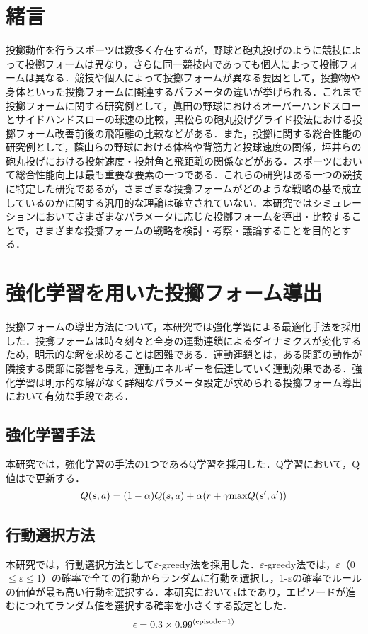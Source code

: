 \section{緒言}
投擲動作を行うスポーツは数多く存在するが，野球と砲丸投げのように競技によって投擲フォームは異なり，さらに同一競技内であっても個人によって投擲フォームは異なる．競技や個人によって投擲フォームが異なる要因として，投擲物や身体といった投擲フォームに関連するパラメータの違いが挙げられる．これまで投擲フォームに関する研究例として，眞田の野球におけるオーバーハンドスローとサイドハンドスローの球速の比較\cite{sanada}，黒松らの砲丸投げグライド投法における投擲フォーム改善前後の飛距離の比較\cite{kuromatsu}などがある．また，投擲に関する総合性能の研究例として，蔭山らの野球における体格や背筋力と投球速度の関係\cite{kageyama}，坪井らの砲丸投げにおける投射速度・投射角と飛距離の関係\cite{tsuboi}などがある．スポーツにおいて総合性能向上は最も重要な要素の一つである．これらの研究はある一つの競技に特定した研究であるが，さまざまな投擲フォームがどのような戦略の基で成立しているのかに関する汎用的な理論は確立されていない．本研究ではシミュレーションにおいてさまざまなパラメータに応じた投擲フォームを導出・比較することで，さまざまな投擲フォームの戦略を検討・考察・議論することを目的とする．\\
\section{強化学習を用いた投擲フォーム導出}
投擲フォームの導出方法について，本研究では強化学習\cite{rl1}による最適化手法を採用した．投擲フォームは時々刻々と全身の運動連鎖\cite{burkhart}によるダイナミクスが変化するため，明示的な解を求めることは困難である．運動連鎖とは，ある関節の動作が隣接する関節に影響を与え，運動エネルギーを伝達していく運動効果である．強化学習は明示的な解がなく詳細なパラメータ設定が求められる投擲フォーム導出において有効な手段である．
\subsection{強化学習手法}
本研究では，強化学習の手法の1つであるQ学習\cite{watkins}を採用した．Q学習において，Q値はで更新する．
\begin{eqnarray}
  \equlabel{1}
  Q(s,a)=(1-\alpha)Q(s,a)+\alpha(r+\gamma \mathrm{max}Q(s',a'))
\end{eqnarray}
\subsection{行動選択方法}
本研究では，行動選択方法として$\varepsilon$-greedy法\cite{greedy}を採用した．$\varepsilon$-greedy法では，$\varepsilon$（0$\leq$$\varepsilon$$\leq$1）の確率で全ての行動からランダムに行動を選択し，1-$\varepsilon$の確率でルールの価値が最も高い行動を選択する．本研究において$\epsilon$はであり，エピソードが進むにつれてランダム値を選択する確率を小さくする設定とした．
\begin{eqnarray}
  \equlabel{2}
  \epsilon = 0.3 \times 0.99^{(\mathrm{episode} + 1)}
\end{eqnarray}
